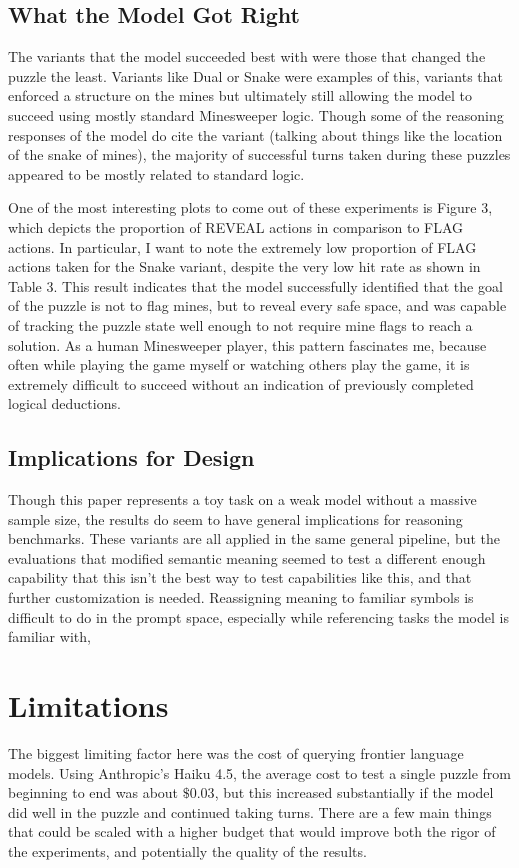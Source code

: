 \documentclass[11pt,conference,compsoc]{IEEEtran}
\begin{document}
\subsection{What the Model Got Right}
The variants that the model succeeded best with were those that changed the puzzle the least. Variants like Dual or Snake were examples of this, variants that enforced a structure on the mines but ultimately still allowing the model to succeed using mostly standard Minesweeper logic. Though some of the reasoning responses of the model do cite the variant (talking about things like the location of the snake of mines), the majority of successful turns taken during these puzzles appeared to be mostly related to standard logic.

One of the most interesting plots to come out of these experiments is Figure 3, which depicts the proportion of REVEAL actions in comparison to FLAG actions. In particular, I want to note the extremely low proportion of FLAG actions taken for the Snake variant, despite the very low hit rate as shown in Table 3. This result indicates that the model successfully identified that the goal of the puzzle is not to flag mines, but to reveal every safe space, and was capable of tracking the puzzle state well enough to not require mine flags to reach a solution. As a human Minesweeper player, this pattern fascinates me, because often while playing the game myself or watching others play the game, it is extremely difficult to succeed without an indication of previously completed logical deductions.

\subsection{Implications for Design}
Though this paper represents a toy task on a weak model without a massive sample size, the results do seem to have general implications for reasoning benchmarks. These variants are all applied in the same general pipeline, but the evaluations that modified semantic meaning seemed to test a different enough capability that this isn't the best way to test capabilities like this, and that further customization is needed.
Reassigning meaning to familiar symbols is difficult to do in the prompt space, especially while referencing tasks the model is familiar with, 


\section{Limitations}
The biggest limiting factor here was the cost of querying frontier language models. Using Anthropic's Haiku 4.5, the average cost to test a single puzzle from beginning to end was about $\$0.03$, but this increased substantially if the model did well in the puzzle and continued taking turns. There are a few main things that could be scaled with a higher budget that would improve both the rigor of the experiments, and potentially the quality of the results.
\end{document}
